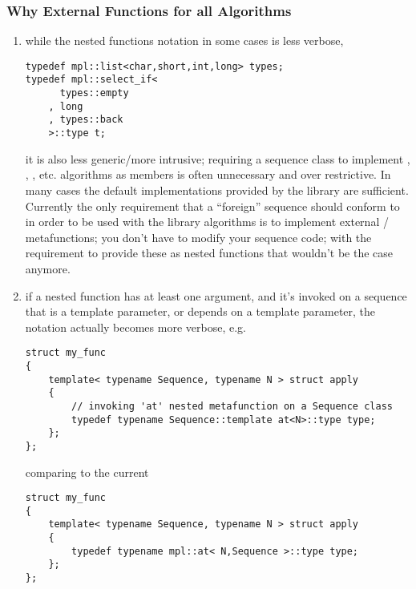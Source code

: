 \documentclass{kapproc}
\newcommand{\mfns}{meta\-func\-tions}
\begin{document}
\subsubsection{Why External Functions for all Algorithms}

\begin{enumerate}
 \item while the nested functions notation in some cases is 
 less verbose, 

{\small
\begin{codesamp}\begin{verbatim}
typedef mpl::list<char,short,int,long> types;
typedef mpl::select_if<
      types::empty
    , long
    , types::back
    >::type t;
\end{verbatim}
\end{codesamp}
}

it is also less generic/more intrusive; requiring a sequence 
class to implement , , , etc. 
algorithms as members is often unnecessary and over restrictive. 
In many cases the default implementations provided by the library 
are sufficient.
Currently the only requirement that a ``foreign'' sequence should 
conform to in order to be used with the library algorithms is to 
implement external / \mfns; you 
don't have to modify your sequence code; with the requirement to 
provide these as nested functions that wouldn't be the case anymore. 

\item if a nested function has at least one argument, and it's 
invoked on a sequence that is a template parameter, or depends 
on a template parameter, the notation actually becomes more 
verbose, e.g. 

{\small
\begin{codesamp}\begin{verbatim}
struct my_func
{
    template< typename Sequence, typename N > struct apply
    {
        // invoking 'at' nested metafunction on a Sequence class
        typedef typename Sequence::template at<N>::type type;
    };
};
\end{verbatim}
\end{codesamp}
}

comparing to the current 

{\small
\begin{codesamp}\begin{verbatim}
struct my_func
{
    template< typename Sequence, typename N > struct apply
    {
        typedef typename mpl::at< N,Sequence >::type type;
    };
};
\end{verbatim}
\end{codesamp}
}


\end{enumerate}
\end{document}
